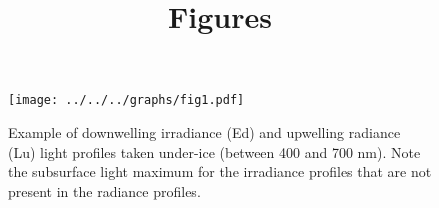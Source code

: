 \documentclass[12pt,a4paper]{scrartcl}
\title{Figures}
\date{}
\begin{document}
    \maketitle
    
     \begin{figure}[h]
         \centering
         \texttt{[image: ../../../graphs/fig1.pdf]}
         \caption{Example of downwelling irradiance (Ed) and upwelling radiance (Lu) light profiles taken under-ice (between 400 and 700 nm). Note the subsurface light maximum for the irradiance profiles that are not present in the radiance profiles.}
     \end{figure}
    
    \clearpage
    \newpage

    
\end{document}
